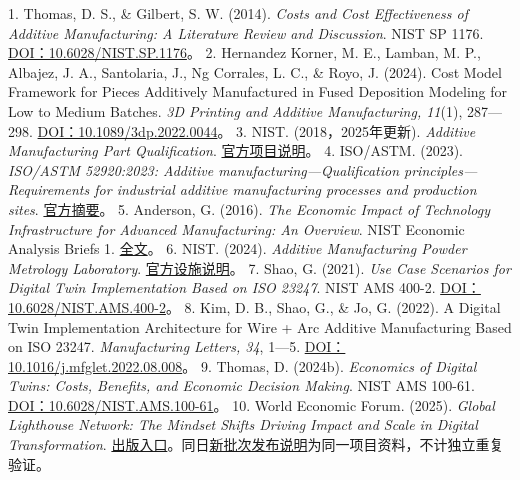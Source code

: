 \documentclass[UTF8,fontset=windows,12pt,a4paper,oneside,openany]{ctexbook}
\begin{document}
1. Thomas, D. S., \& Gilbert, S. W. (2014). \emph{Costs and Cost Effectiveness of Additive Manufacturing: A Literature Review and Discussion}. NIST SP 1176. \href{https://doi.org/10.6028/NIST.SP.1176}{DOI：10.6028/NIST.SP.1176}。
2. Hernandez Korner, M. E., Lamban, M. P., Albajez, J. A., Santolaria, J., Ng Corrales, L. C., \& Royo, J. (2024). Cost Model Framework for Pieces Additively Manufactured in Fused Deposition Modeling for Low to Medium Batches. \emph{3D Printing and Additive Manufacturing, 11}(1), 287—298. \href{https://doi.org/10.1089/3dp.2022.0044}{DOI：10.1089/3dp.2022.0044}。
3. NIST. (2018，2025年更新). \emph{Additive Manufacturing Part Qualification}. \href{https://www.nist.gov/programs-projects/additive-manufacturing-part-qualification}{官方项目说明}。
4. ISO/ASTM. (2023). \emph{ISO/ASTM 52920:2023: Additive manufacturing—Qualification principles—Requirements for industrial additive manufacturing processes and production sites}. \href{https://www.iso.org/standard/76911.html?browse=tc}{官方摘要}。
5. Anderson, G. (2016). \emph{The Economic Impact of Technology Infrastructure for Advanced Manufacturing: An Overview}. NIST Economic Analysis Briefs 1. \href{https://www.nist.gov/system/files/documents/2024/12/05/NIST.EAB_.1_R_1.pdf}{全文}。
6. NIST. (2024). \emph{Additive Manufacturing Powder Metrology Laboratory}. \href{https://www.nist.gov/laboratories/tools-instruments/additive-manufacturing-powder-metrology-laboratory}{官方设施说明}。
7. Shao, G. (2021). \emph{Use Case Scenarios for Digital Twin Implementation Based on ISO 23247}. NIST AMS 400-2. \href{https://doi.org/10.6028/NIST.AMS.400-2}{DOI：10.6028/NIST.AMS.400-2}。
8. Kim, D. B., Shao, G., \& Jo, G. (2022). A Digital Twin Implementation Architecture for Wire + Arc Additive Manufacturing Based on ISO 23247. \emph{Manufacturing Letters, 34}, 1—5. \href{https://doi.org/10.1016/j.mfglet.2022.08.008}{DOI：10.1016/j.mfglet.2022.08.008}。
9. Thomas, D. (2024b). \emph{Economics of Digital Twins: Costs, Benefits, and Economic Decision Making}. NIST AMS 100-61. \href{https://doi.org/10.6028/NIST.AMS.100-61}{DOI：10.6028/NIST.AMS.100-61}。
10. World Economic Forum. (2025). \emph{Global Lighthouse Network: The Mindset Shifts Driving Impact and Scale in Digital Transformation}. \href{https://www.weforum.org/publications/global-lighthouse-network-the-mindset-shifts-driving-impact-and-scale-in-digital-transformation/}{出版入口}。同日\href{https://www.weforum.org/press/2025/01/global-lighthouse-network-2025-world-economic-forum-recognizes-companies-transforming-manufacturing-through-innovation/}{新批次发布说明}为同一项目资料，不计独立重复验证。
\end{document}
